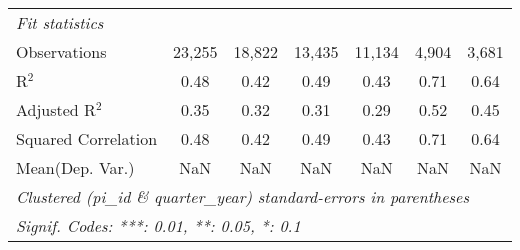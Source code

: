 \begin{tabular}{lcccccc}
   \midrule
   \emph{Fit statistics}\\
   Observations                                               & 23,255        & 18,822        & 13,435       & 11,134        & 4,904    & 3,681\\  
   R$^2$                                                      & 0.48          & 0.42          & 0.49         & 0.43          & 0.71     & 0.64\\  
   Adjusted R$^2$                                             & 0.35          & 0.32          & 0.31         & 0.29          & 0.52     & 0.45\\  
   Squared Correlation                                        & 0.48          & 0.42          & 0.49         & 0.43          & 0.71     & 0.64\\  
Mean(Dep. Var.) & NaN & NaN & NaN & NaN & NaN & NaN \\
   \midrule \midrule
   \multicolumn{7}{l}{\emph{Clustered (pi\_id \& quarter\_year) standard-errors in parentheses}}\\
   \multicolumn{7}{l}{\emph{Signif. Codes: ***: 0.01, **: 0.05, *: 0.1}}\\
\end{tabular}
\par\endgroup
